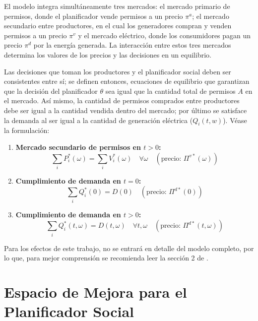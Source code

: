 El modelo integra simultáneamente tres mercados: el mercado primario de permisos, donde el planificador vende permisos a un precio $\pi^{a}$; el mercado secundario entre productores, en el cual los generadores compran y venden permisos a un precio $\pi^{v}$ y el mercado eléctrico, donde los consumidores pagan un precio $\pi^{d}$ por la energía generada.  La interacción entre estos tres mercados determina los valores de los precios y las decisiones en un equilibrio.\medskip

Las decisiones que toman los productores y el planificador social deben ser consistentes entre sí; se definen entonces, ecuaciones de equilibrio que garantizan que la decisión del planificador $\theta$ sea igual que la cantidad total de permisos $A$ en el mercado. Así mismo, la cantidad de permisos comprados entre productores debe ser igual a la cantidad vendida dentro del mercado; por último se satisface la demanda al ser igual a la cantidad de generación eléctrica ($Q_i(t,w)$). Véase la formulación:

\begin{enumerate}

    \item \textbf{Mercado secundario de permisos en $t>0$:}
    \begin{equation}
    \sum_i P_i^*(\omega) = \sum_i V_i^*(\omega) \quad \forall \omega \quad (\text{precio: } \Pi^{v*}(\omega))
    \end{equation}
    \item \textbf{Cumplimiento de demanda en $t=0$:}
    \begin{equation}
    \sum_i Q_i^*(0) = D(0) \quad (\text{precio: } \Pi^{d*}(0))
    \end{equation}
    \item \textbf{Cumplimiento de demanda en $t>0$:}
    \begin{equation}
    \sum_i Q_i^*(t,\omega) = D(t,\omega) \quad \forall t,\omega \quad (\text{precio: } \Pi^{d*}(t,\omega))
    \end{equation}
\end{enumerate}

Para los efectos de este trabajo, no se entrará en detalle del modelo completo, por lo que, para mejor comprensión se recomienda leer la sección 2 de .

\section{Espacio de Mejora para el Planificador Social}
\label{sec:espaciomejora}

